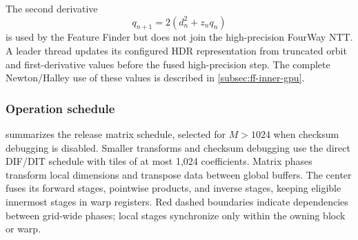 The second derivative
\begin{equation}
  q_{n+1}=2(d_n^2+z_nq_n)
\end{equation}
is used by the Feature Finder but does not join the high-precision FourWay NTT.
A leader thread updates its configured HDR representation from truncated orbit
and first-derivative values before the fused high-precision step.  The complete
Newton/Halley use of these values is described in
\cref{subsec:ff-inner-gpu}.

\subsubsection{Operation schedule}
\label{subsec:fused-ntt-operation-schedule}

 summarizes the release matrix schedule, selected for
$M>1024$ when checksum debugging is disabled.  Smaller transforms and checksum
debugging use the direct DIF/DIT schedule with tiles of at most 1,024
coefficients.  Matrix phases transform local dimensions and transpose data
between global buffers.  The center fuses its forward stages, pointwise
products, and inverse stages, keeping eligible innermost stages in warp
registers.  Red dashed boundaries indicate dependencies between grid-wide
phases; local stages synchronize only within the owning block or warp.

